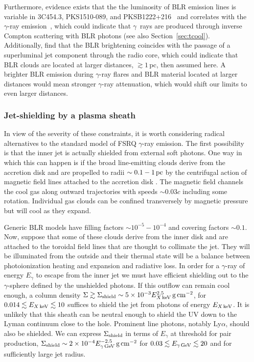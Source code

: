 \documentclass[twocolumn,linenumbers]{aastex62}
\newcommand{\Grays}{$\gamma$~rays\xspace}
\newcommand{\gray}{$\gamma$-ray\xspace}
\begin{document}
Furthermore, evidence exists that the the luminosity of BLR emission lines is variable in 3C454.3, PKS1510-089, and PKSB1222+216~\citep{2013ApJ...763L..36L,2015ApJ...804....7I} and correlates with the \gray emission~\citep{2013ApJ...763L..36L,2015IAUS..313...43L}, which could indicate that \Grays are produced through inverse Compton scattering with BLR photons (see also Section~\ref{sec:tcool}).  
Additionally, \citet{2013ApJ...763L..36L} find that the BLR brightening coincides with the passage of a superluminal jet component through the radio core, which could indicate that BLR clouds are located at larger distances, $\gtrsim 1\,$pc, then assumed here.
A brighter BLR emission during \gray flares and BLR material located at larger distances would mean stronger \gray attenuation, which would shift our limits to even larger distances. 

\subsubsection{Jet-shielding by a plasma sheath}
\label{sec:plasma-sheath}

In view of the severity of these constraints, it is worth considering radical alternatives to the standard model of FSRQ \gray emission. The first possibility is that the inner jet is actually shielded from external soft photons. One way in which this can happen is if the broad line-emitting clouds derive from the accretion disk and are propelled to radii $\sim0.1-1\,{\rm pc}$ by the centrifugal action of magnetic field lines attached to the accretion disk \citep{emmering:1992mac,1994ApJ...434..446K,bottorf:1997dyn}. The magnetic field channels the cool gas along outward trajectories with speeds $\sim0.03c$ including some rotation.  Individual gas clouds can be confined transversely by magnetic pressure but will cool as they expand. 

Generic BLR models have filling factors $\sim10^{-5}-10^{-4}$ and covering factors $\sim0.1$. Now, suppose that some of these clouds derive from the inner disk and are attached to the toroidal field lines that are thought to collimate the jet. They will be illuminated from the outside and their thermal state will be a balance between photoionization heating and expansion and radiative loss. In order for a \gray of energy $E_\gamma$ to escape from the inner jet we must have efficient shielding out to the $\gamma$-sphere  \citep{1995ApJ...441...79B} defined by the unshielded photons. If this outflow can remain cool enough, a column density $\Sigma\gtrsim\Sigma_{\rm shield}\sim5\times10^{-3}E_{X\,\rm keV}^{2.5}\,{\rm g\,cm}^{-2}$, for $0.014\lesssim E_{X\,\rm keV}\lesssim10$ suffices to shield the jet from photons of energy $E_{X\,\rm keV}$. It is unlikely that this sheath can be neutral enough to shield the UV down to the Lyman continuum close to the hole. Prominent line photons, notably Ly$\alpha$, should also be shielded. We can express $\Sigma_{\rm shield}$ in terms of $E_\gamma$ at threshold for pair production, $\Sigma_{\rm shield}\sim2\times10^{-4}E_{\gamma\,\rm GeV}^{-2.5}\,{\rm g\,cm}^{-2}$ for $0.03\lesssim E_{\gamma\,{\rm GeV}}\lesssim20$ and for sufficiently large jet radius. 
\end{document}
